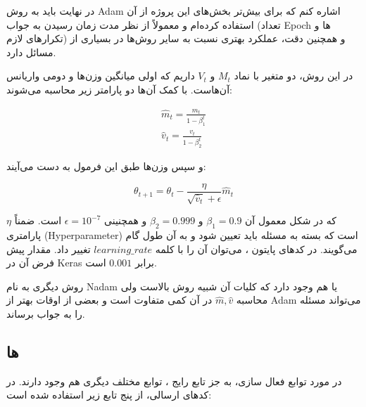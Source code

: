 \documentclass[12pt,titlepage,a4page , tikz , multi,table , svgnames,xcdraw]{article}
\begin{document}
در نهایت باید به روش Adam اشاره کنم که برای بیش‌تر بخش‌های این پروژه از آن استفاده کرده‌ام و معمولاً از نظر مدت زمان رسیدن به جواب (تعداد Epoch ها و تکرارهای لازم) و همچنین دقت، عملکرد بهتری نسبت به سایر روش‌ها در بسیاری از مسائل دارد.

در این روش، دو متغیر با نماد $M_t$ و $V_t$ داریم که اولی میانگین وزن‌ها و دومی واریانس آن‌هاست. با کمک آن‌ها دو پارامتر زیر محاسبه می‌شوند:

$$\begin{array}{l}
\hat{m}_{t}=\frac{m_{t}}{1-\beta_{1}^{t}} \\
\hat{v}_{t}=\frac{v_{t}}{1-\beta_{2}^{t}}
\end{array}$$

و سپس وزن‌ها طبق این فرمول به دست می‌آیند:

$$\theta_{t+1}=\theta_{t}-\frac{\eta}{\sqrt{\hat{v}_{t}}+\epsilon} \hat{m}_{t}$$

که در شکل معمول آن $\beta_1 = 0.9$ و $\beta_2 = 0.999$ و همچنینی $\epsilon = 10^{-7}$ است. ضمناً $\eta$ پارامتری (Hyperparameter) است که بسته به مسئله باید تعیین شود و به آن طول گام می‌گویند. در کدهای پایتون ، می‌توان آن را با کلمه $learning\_rate$ تغییر داد. مقدار پیش فرض آن در Keras برابر $0.001$ است.

روش دیگری به نام Nadam یا  هم وجود دارد که کلیات آن شبیه روش بالاست ولی محاسبه $\hat{m} , \hat{v}$ در آن کمی متفاوت است و بعضی از اوقات بهتر از Adam می‌تواند مسئله را به جواب برساند.


\subsection{ ها}

در مورد توابع فعال سازی، به جز تابع رایج ، توابع مختلف دیگری هم وجود دارند. در کدهای ارسالی، از پنج تابع زیر استفاده شده است:
\end{document}

